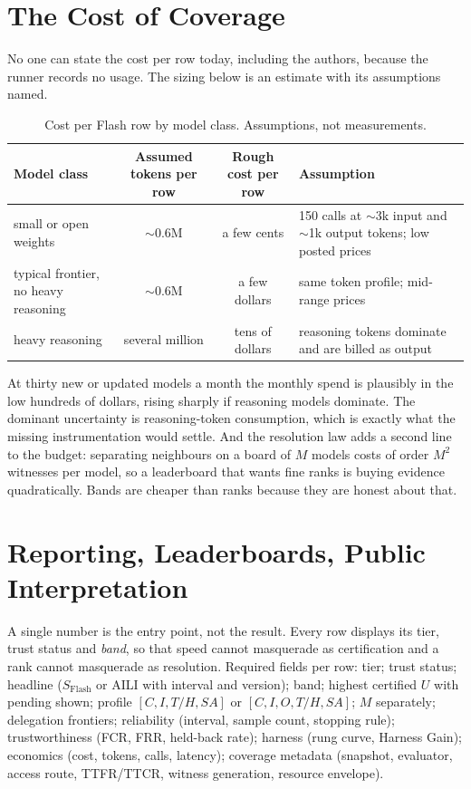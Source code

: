 \documentclass[11pt]{article}
\theoremstyle{definition}
\begin{document}
\section{The Cost of Coverage}\label{sec:cost}

No one can state the cost per row today, including the authors, because the runner records no usage. The sizing below is an estimate with its assumptions named.

\begin{table}[!htbp]
\centering\small
\begin{tabularx}{\textwidth}{@{}l c c Y@{}}
\toprule
Model class & Assumed tokens per row & Rough cost per row & Assumption \\
\midrule
small or open weights & $\sim$0.6M & a few cents & 150 calls at $\sim$3k input and $\sim$1k output tokens; low posted prices \\
typical frontier, no heavy reasoning & $\sim$0.6M & a few dollars & same token profile; mid-range prices \\
heavy reasoning & several million & tens of dollars & reasoning tokens dominate and are billed as output \\
\bottomrule
\end{tabularx}
\caption{Cost per Flash row by model class. Assumptions, not measurements.}
\label{tab:cost}
\end{table}

At thirty new or updated models a month the monthly spend is plausibly in the low hundreds of dollars, rising sharply if reasoning models dominate. The dominant uncertainty is reasoning-token consumption, which is exactly what the missing instrumentation would settle. And the resolution law adds a second line to the budget: separating neighbours on a board of $M$ models costs of order $M^2$ witnesses per model, so a leaderboard that wants fine ranks is buying evidence quadratically. Bands are cheaper than ranks because they are honest about that.

\section{Reporting, Leaderboards, Public Interpretation}\label{sec:public}

A single number is the entry point, not the result. Every row displays its tier, trust status and \emph{band}, so that speed cannot masquerade as certification and a rank cannot masquerade as resolution. Required fields per row: tier; trust status; headline ($S_{\mathrm{Flash}}$ or AILI with interval and version); band; highest certified $U$ with pending shown; profile $[C, I, T/H, SA]$ or $[C, I, O, T/H, SA]$; $M$ separately; delegation frontiers; reliability (interval, sample count, stopping rule); trustworthiness (FCR, FRR, held-back rate); harness (rung curve, Harness Gain); economics (cost, tokens, calls, latency); coverage metadata (snapshot, evaluator, access route, TTFR/TTCR, witness generation, resource envelope).
\end{document}
